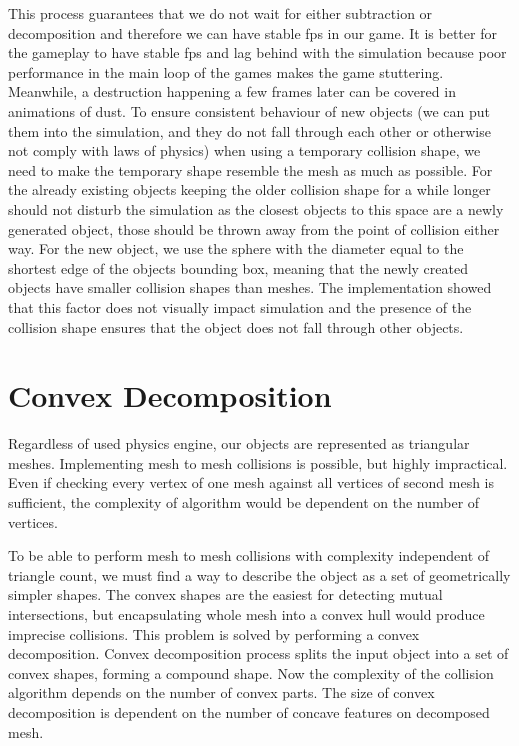 This process guarantees that we do not wait for either subtraction or decomposition and therefore we can have stable fps in our game.  It is better for the gameplay to have stable fps and lag behind with the simulation because poor performance in the main loop of the games makes the game stuttering. Meanwhile, a destruction happening a few frames later can be covered in animations of dust. To ensure consistent behaviour of new objects (we can put them into the simulation, and they do not fall through each other or otherwise not comply with laws of physics) when using a temporary collision shape, we need to make the temporary shape resemble the mesh as much as possible.  For the already existing objects keeping the older collision shape for a while longer should not disturb the simulation as the closest objects to this space are a newly generated object, those should be thrown away from the point of collision either way. For the new object, we use the sphere with the diameter equal to the shortest edge of the objects bounding box, meaning that the newly created objects have smaller collision shapes than meshes. The implementation showed that this factor does not visually impact simulation and the presence of the collision shape ensures that the object does not fall through other objects. 


\section{Convex Decomposition}
\label{sec:decomposition}
Regardless of used physics engine, our objects are represented as triangular meshes. Implementing mesh to mesh collisions is possible, but highly impractical. Even if checking every vertex of one mesh against all vertices of second mesh is sufficient, the complexity of algorithm would be dependent on the number of vertices.

To be able to perform mesh to mesh collisions with complexity independent of triangle count, we must find a way to describe the object as a set of geometrically simpler shapes. The convex shapes are the easiest for detecting mutual intersections, but encapsulating whole mesh into a convex hull would produce imprecise collisions. This problem is solved by performing a convex decomposition. Convex decomposition process splits the input object into a set of convex shapes, forming a compound shape. Now the complexity of the collision algorithm depends on the number of convex parts. The size of convex decomposition is dependent on the number of concave features on decomposed mesh.

